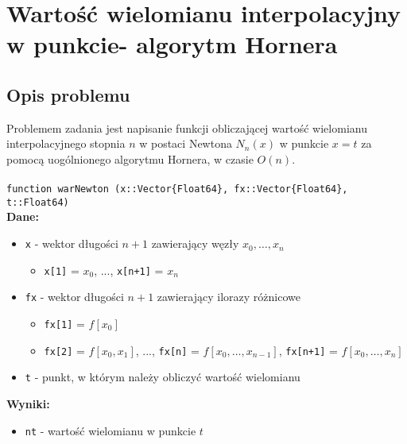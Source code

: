 \documentclass{article}
\begin{document}
\section{Wartość wielomianu interpolacyjny w punkcie- algorytm Hornera}
\subsection{Opis problemu}
Problemem zadania jest napisanie funkcji obliczającej wartość wielomianu interpolacyjnego stopnia $n$ w postaci Newtona $N_n(x)$ w punkcie $x = t$ za pomocą uogólnionego algorytmu Hornera, w czasie $O(n)$. \\ \\
\texttt{function warNewton (x::Vector\{Float64\}, fx::Vector\{Float64\}, t::Float64)}
\\ \textbf{Dane:}
\begin{itemize}[label={}]
    \item \texttt{x} - wektor długości $n+1$ zawierający węzły $x_0, \dots, x_n$ 
        \begin{itemize}[label={}]
            \item \texttt{x[1]} = $x_0$, ..., \texttt{x[n+1]} = $x_n$
        \end{itemize}
    \item \texttt{fx} - wektor długości $n+1$ zawierający ilorazy różnicowe
        \begin{itemize}[label={}]
            \item \texttt{fx[1]} = $f[x_0]$
            \item \texttt{fx[2]} = $f[x_0, x_1]$, ..., \texttt{fx[n]} = $f[x_0, \dots, x_{n-1}]$,  \texttt{fx[n+1]} = $f[x_0, \dots, x_n]$
        \end{itemize}
    \item \texttt{t} - punkt, w którym należy obliczyć wartość wielomianu
\end{itemize}
\textbf{Wyniki:}
\begin{itemize}[label={}]
    \item \texttt{nt} - wartość wielomianu w punkcie $t$
\end{itemize}
\end{document}
